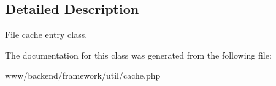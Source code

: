 \subsection{Detailed Description}
File cache entry class. 

The documentation for this class was generated from the following file:\begin{DoxyCompactItemize}
\item 
www/backend/framework/util/cache.php\end{DoxyCompactItemize}
